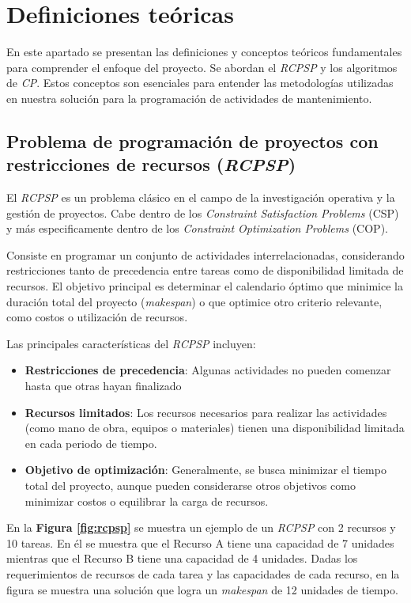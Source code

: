 \documentclass{article}
\begin{document}
  \section{Definiciones teóricas}

En este apartado se presentan las definiciones y conceptos teóricos fundamentales para comprender el enfoque del proyecto. Se abordan el \textit{RCPSP} y los algoritmos de \textit{CP}. Estos conceptos son esenciales para entender las metodologías utilizadas en nuestra solución para la programación de actividades de mantenimiento.

\subsection{Problema de programación de proyectos con restricciones de recursos (\textit{RCPSP})}
El \textit{RCPSP} es un problema clásico en el campo de la investigación operativa y la gestión de proyectos. Cabe dentro de los \textit{Constraint Satisfaction Problems} (CSP) y más especificamente dentro de los \textit{Constraint Optimization Problems} (COP).

Consiste en programar un conjunto de actividades interrelacionadas, considerando restricciones tanto de precedencia entre tareas como de disponibilidad limitada de recursos. El objetivo principal es determinar el calendario óptimo que minimice la duración total del proyecto (\textit{makespan}) o que optimice otro criterio relevante, como costos o utilización de recursos\cite{artigues2008resource}.
    

Las principales características del \textit{RCPSP} incluyen:
\begin{itemize}
  \item \textbf{Restricciones de precedencia}: Algunas actividades no pueden comenzar hasta que otras hayan finalizado
  \item \textbf{Recursos limitados}: Los recursos necesarios para realizar las actividades (como mano de obra, equipos o materiales) tienen una disponibilidad limitada en cada periodo de tiempo.
  \item \textbf{Objetivo de optimización}: Generalmente, se busca minimizar el tiempo total del proyecto, aunque pueden considerarse otros objetivos como minimizar costos o equilibrar la carga de recursos.
\end{itemize}

En la \textbf{Figura \ref{fig:rcpsp}} se muestra un ejemplo de un \textit{RCPSP} con 2 recursos y 10 tareas. En él se muestra que el Recurso A tiene una capacidad de 7 unidades mientras que el Recurso B tiene una capacidad de 4 unidades. Dadas los requerimientos de recursos de cada tarea y las capacidades de cada recurso, en la figura se muestra una solución que logra un \textit{makespan} de 12 unidades de tiempo.
\end{document}
